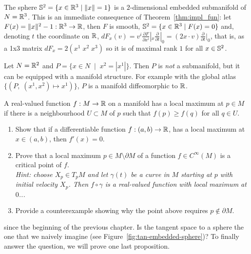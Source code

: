 \begin{example}\label{ex:s2}
	The sphere $\mathbb{S}^2 = \{x\in\mathbb{R}^3 \mid \|x\| = 1\}$ is a $2$-dimensional embedded submanifold of $N=\mathbb{R}^3$.
	This is an immediate consequence of Theorem~\ref{thm:impl_fun}: let $F(x) = \|x\|^2 -1 : \mathbb{R}^3 \to \mathbb{R}$, then $F$ is smooth, $\mathbb{S}^2 = \{x\in\mathbb{R}^3\mid F(x)=0\}$ and, denoting $t$ the coordinate on $\mathbb{R}$, $dF_x(v)= v^i \frac{\partial F}{\partial x^i}|_x \frac{\partial}{\partial t}|_0 = (2x\cdot v) \frac{\partial}{\partial t}|_0$, that is, as a 1x3 matrix $dF_x = 2(x^1\; x^2\; x^3)$ so it is of maximal rank $1$ for all $x\in\mathbb{S}^2$.
\end{example}

\begin{example}
	Let $N = \mathbb{R}^2$ and $P = \{ x\in N \;\mid\; x^2 = |x^1| \}$.
	Then $P$ is \emph{not} a submanifold, but it can be equipped with a manifold structure.
	For example with the global atlas $\{(P,\; (x^1,x^2)\mapsto x^1)\}$, $P$ is a manifold diffeomorphic to $\mathbb{R}$.
\end{example}

\begin{exercise}
	A real-valued function $f:M\to\mathbb{R}$ on a manifold has a local maximum at $p\in M$ if there is a neighbourhood $U\subset M$ of $p$ such that $f(p) \geq f(q)$ for all $q\in U$.
	\begin{enumerate}
		\item Show that if a differentiable function $f:(a,b)\to\mathbb{R}$, has a local maximum at $x\in (a,b)$, then $f'(x) = 0$.
		\item Prove that a local maximum $p\in M\setminus\partial M$ of a function $f\in C^\infty(M)$ is a critical point of $f$.\\
		      \textit{\small Hint: choose $X_p\in T_pM$ and let $\gamma(t)$ be a curve in $M$ starting at $p$ with initial velocity $X_p$. Then $f\circ \gamma$ is a real-valued function with local maximum at $0$...}
		\item Provide a counterexample showing why the point above requires $p\not\in\partial M$.
	\end{enumerate}
\end{exercise}

 since the beginning of the previous chapter.
Is the tangent space to a sphere the one that we naively imagine (see Figure~\ref{fig:tan-embedded-sphere})?
To finally answer the question, we will prove one last proposition.

